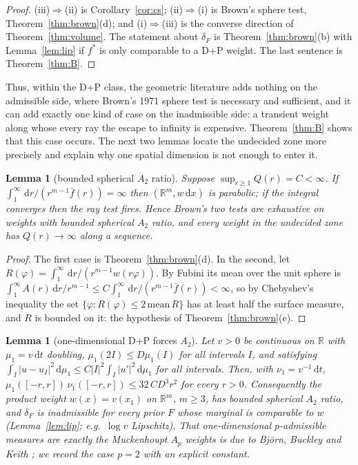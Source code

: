 \documentclass[11pt]{amsart}
\newcommand{\R}{\mathbb{R}}
\newcommand{\dd}{\,\mathrm{d}}
\newcommand{\abs}[1]{\lvert #1\rvert}
\newcommand{\fbar}{\bar f}
\theoremstyle{plain}
\newtheorem{lemma}[theorem]{Lemma}
\theoremstyle{definition}
\theoremstyle{remark}
\begin{document}
\begin{proof}
(iii)$\Rightarrow$(ii) is Corollary~\ref{cor:cs}; (ii)$\Rightarrow$(i) is
Brown's sphere test, Theorem~\ref{thm:brown}(d); and (i)$\Rightarrow$(iii) is
the converse direction of Theorem~\ref{thm:volume}. The statement about $\delta_F$ is
Theorem~\ref{thm:brown}(b) with Lemma~\ref{lem:lip} if $f^*$ is only
comparable to a D+P weight. The last sentence is Theorem~\ref{thm:B}.
\end{proof}

Thus, within the D+P class, the geometric literature adds nothing on the
admissible side, where Brown's 1971 sphere test is necessary and sufficient, and
it can add exactly one kind of case on the inadmissible side: a transient weight
along whose every ray the escape to infinity is expensive. Theorem~\ref{thm:B}
shows that this case occurs. The next two lemmas locate the undecided zone more
precisely and explain why one spatial dimension is not enough to enter it.

\begin{lemma}[bounded spherical $A_2$ ratio]\label{lem:a2}
Suppose $\sup_{r\ge1}Q(r)=C<\infty$. If
$\int_1^\infty\dd r/(r^{m-1}\fbar(r))=\infty$ then $(\R^m,w\dd x)$ is parabolic;
if the integral converges then the ray test fires. Hence Brown's two tests are
exhaustive on weights with bounded spherical $A_2$ ratio, and every weight in
the undecided zone has $Q(r)\to\infty$ along a sequence.
\end{lemma}

\begin{proof}
The first case is Theorem~\ref{thm:brown}(d). In the second, let
$R(\varphi)=\int_1^\infty\dd r/(r^{m-1}w(r\varphi))$. By Fubini its mean over
the unit sphere is $\int_1^\infty A(r)\dd r/r^{m-1}\le
C\int_1^\infty\dd r/(r^{m-1}\fbar(r))<\infty$, so by Chebyshev's inequality the
set $\{\varphi:R(\varphi)\le2\,\mathrm{mean}\,R\}$ has at least half the surface
measure, and $R$ is bounded on it: the hypothesis of
Theorem~\ref{thm:brown}(e).
\end{proof}

\begin{lemma}[one-dimensional D+P forces $A_2$]\label{lem:1d}
Let $v>0$ be continuous on $\R$ with $\mu_1=v\dd t$ doubling, $\mu_1(2I)\le
D\mu_1(I)$ for all intervals $I$, and satisfying
$\int_I\abs{u-u_I}^2\dd\mu_1\le C\abs I^2\int_I\abs{u'}^2\dd\mu_1$ for all
intervals. Then, with $\nu_1=v^{-1}\dd t$,
$\mu_1([-r,r])\,\nu_1([-r,r])\le32\,CD^3r^2$ for every $r>0$. Consequently the
product weight $w(x)=v(x_1)$ on $\R^m$, $m\ge3$, has bounded spherical $A_2$
ratio, and $\delta_F$ is inadmissible for every prior $F$ whose marginal is
comparable to $w$ (Lemma~\ref{lem:lip}; e.g.\ $\log v$ Lipschitz). That one-dimensional
$p$-admissible measures are exactly the Muckenhoupt $A_p$ weights is due to
Bj\"orn, Buckley and Keith \cite{bbk2006}; we record the case $p=2$ with an
explicit constant.
\end{lemma}
\end{document}
